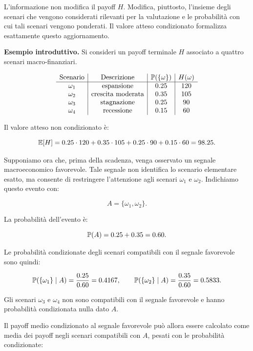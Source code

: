 L'informazione non modifica il payoff $H$. Modifica, piuttosto, l'insieme degli scenari che vengono considerati rilevanti per la valutazione e le probabilit\`{a} con cui tali scenari vengono ponderati. Il valore atteso condizionato formalizza esattamente questo aggiornamento.

\medskip

\noindent
\textbf{Esempio introduttivo.}
Si consideri un payoff terminale $H$ associato a quattro scenari macro-finanziari.

\[
\begin{array}{c|c|c|c}
\text{Scenario} & \text{Descrizione} & \mathbb{P}(\{\omega\}) & H(\omega) \\
\hline
\omega_1 & \text{espansione} & 0.25 & 120 \\
\omega_2 & \text{crescita moderata} & 0.35 & 105 \\
\omega_3 & \text{stagnazione} & 0.25 & 90 \\
\omega_4 & \text{recessione} & 0.15 & 60 \\
\end{array}
\]

Il valore atteso non condizionato \`{e}:

\[
\mathbb{E}[H]
=
0.25\cdot 120
+
0.35\cdot 105
+
0.25\cdot 90
+
0.15\cdot 60
=
98.25.
\]

Supponiamo ora che, prima della scadenza, venga osservato un segnale macroeconomico favorevole. Tale segnale non identifica lo scenario elementare esatto, ma consente di restringere l'attenzione agli scenari $ \omega_1 $ e $ \omega_2 $. Indichiamo questo evento con:

\[
A=\{\omega_1,\omega_2\}.
\]

La probabilit\`{a} dell'evento \`{e}:

\[
\mathbb{P}(A)=0.25+0.35=0.60.
\]

Le probabilit\`{a} condizionate degli scenari compatibili con il segnale favorevole sono quindi:

\[
\mathbb{P}(\{\omega_1\}\mid A)
=
\frac{0.25}{0.60}
=
0.4167,
\qquad
\mathbb{P}(\{\omega_2\}\mid A)
=
\frac{0.35}{0.60}
=
0.5833.
\]

Gli scenari $\omega_3$ e $\omega_4$ non sono compatibili con il segnale favorevole e hanno probabilit\`{a} condizionata nulla dato $A$.

Il payoff medio condizionato al segnale favorevole pu\`{o} allora essere calcolato come media dei payoff negli scenari compatibili con $A$, pesati con le probabilit\`{a} condizionate:


